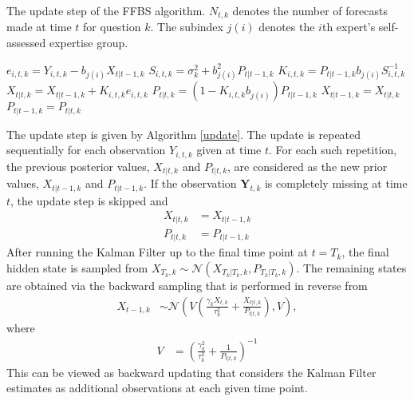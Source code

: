 \documentclass[aoas, preprint]{imsart}
\numberwithin{equation}{section}
\theoremstyle{plain}
\begin{document}
\begin{algorithm}
\caption{The update step of the FFBS algorithm. $N_{t,k}$ denotes the number of forecasts made at time $t$ for question $k$. The subindex  $j(i)$ denotes the $i$th expert's self-assessed expertise group.}
\label{update}
\begin{algorithmic}
\State $e_{i, t,k} = Y_{i,t,k} - b_{j(i)} X_{t | t-1, k}$
\State $S_{i,t,k} =  \sigma_k^2 + b_{j(i)}^2 P_{t|t-1, k}$
\State $K_{i,t,k} =  P_{t|t-1, k} b_{j(i)} S_{i,t,k}^{-1}$
\State $X_{t|t, k} = X_{t|t-1, k} + K_{i, t,k} e_{i,t,k}$
\State $P_{t|t,k} = (1 - K_{i, t,k} b_{j(i)}) P_{t|t-1,k}$
\State $X_{t|t-1, k} = X_{t|t, k}$
\State $P_{t|t-1, k} = P_{t|t, k}$
\EndIf
\EndFor
\end{algorithmic}
\end{algorithm}
The update step is given by Algorithm \ref{update}.  The update is repeated sequentially for each observation $Y_{i,t,k}$ given at time $t$. For each such repetition, the previous posterior values, $X_{t|t, k}$ and $P_{t|t, k}$, are considered as the new prior values, $X_{t|t-1, k}$ and $P_{t|t-1, k}$. If the observation $\boldsymbol{Y}_{t,k}$ is completely missing at time $t$, the update step is skipped and 
\begin{align*}
X_{t|t, k} &= X_{t|t-1, k}\\
P_{t|t,k} &= P_{t|t-1,k}
\end{align*}
After running the Kalman Filter up to the final time point at $t = T_k$, the final hidden state is sampled from $X_{T_k,k} \sim \mathcal{N}(X_{T_k|T_k, k}, P_{T_k|T_k, k})$. The remaining states are obtained via the backward sampling that is performed in reverse from
\begin{align*}
X_{t-1, k} &\sim  \mathcal{N} \left(V\left( \frac{\gamma_kX_{t,k}}{\tau_k^2}  + \frac{X_{t|t,k}}{P_{t|t,k} } \right),  V\right),
\end{align*}
where
\begin{align*}
V &= \left( \frac{\gamma_k^2}{\tau_k^2} + \frac{1}{P_{t|t,k}}\right)^{-1}
\end{align*}
This can be viewed as backward updating that considers the Kalman Filter estimates as additional observations at each given time point. 
\end{document}
